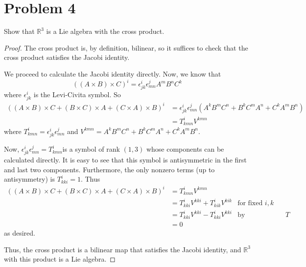 \documentclass[fontsize=11pt]{scrartcl} %
\numberwithin{equation}{section} %
\numberwithin{figure}{section} %
\numberwithin{table}{section} %
\newcommand{\R}{\mathbb{R}}
\begin{document}
\section*{Problem 4} %
Show that $\R^3$ is a Lie algebra with the cross product.
\\
\begin{proof}
    The cross product is, by definition, bilinear, so it suffices to check that the
    cross product satisfies the Jacobi identity.

    We proceed to calculate the Jacobi identity directly. Now, we know that
    \[
        ((A\times B)\times C)^i = \epsilon^i_{jk}\epsilon^j_{mn}A^mB^nC^k
    \]
    where $\epsilon^i_{jk}$ is the Levi-Civita symbol.
    So
    \[
        \begin{aligned}
            ((A\times B)\times C + (B\times C)\times A + (C\times A)\times B)^i &=
            \epsilon^i_{jk}\epsilon^j_{mn}(A^kB^mC^n + B^kC^mA^n + C^kA^mB^n)\\
            &=T^i_{kmn}V^{kmn}
        \end{aligned}
    \]
    where $T^i_{kmn}= \epsilon^i_{jk}\epsilon^j_{mn}$ and $V^{kmn} = A^kB^mC^n +
    B^kC^mA^n + C^kA^mB^n$.

    Now, $\epsilon^i_{jk}\epsilon^j_{mn} = T^i_{kmn}$is a symbol of rank $(1,3)$ whose
    components can be calculated directly. It is easy to see that this symbol is
    antisymmetric in the first and last two components. Furthermore, the only
    nonzero terms (up to antisymmetry) is $T^i_{kki} = 1$. Thus
    \[
        \begin{aligned}
            ((A\times B)\times C + (B\times C)\times A + (C\times A)\times B)^i &=
            T^i_{kmn}V^{kmn}\\
            &=T^i_{kki}V^{kki} + T^i_{kik}V^{kik} &\textrm{for fixed }i,k\\
            &=T^i_{kki}V^{kki} - T^i_{kki}V^{kki} &\textrm{by antisymmetry of
            }T\\
            &=0
        \end{aligned}
    \]
    as desired.

    Thus, the cross product is a bilinear map that satisfies the Jacobi
    identity, and $\R^3$ with this product is a Lie algebra.
\end{proof}
\end{document}

